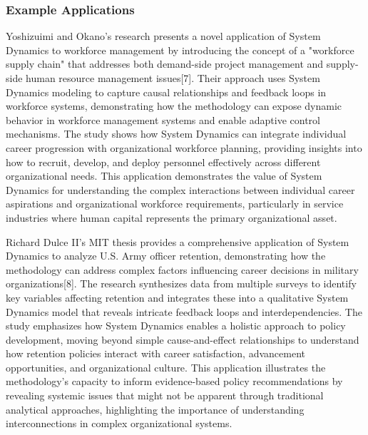 \documentclass[main.tex]{subfiles}
\begin{document}
\subsubsection{Example Applications}


Yoshizuimi and Okano's research presents a novel application of System Dynamics to workforce management by introducing the concept of a "workforce supply chain" that addresses both demand-side project management and supply-side human resource management issues[7]. Their approach uses System Dynamics modeling to capture causal relationships and feedback loops in workforce systems, demonstrating how the methodology can expose dynamic behavior in workforce management systems and enable adaptive control mechanisms. The study shows how System Dynamics can integrate individual career progression with organizational workforce planning, providing insights into how to recruit, develop, and deploy personnel effectively across different organizational needs. This application demonstrates the value of System Dynamics for understanding the complex interactions between individual career aspirations and organizational workforce requirements, particularly in service industries where human capital represents the primary organizational asset.


Richard Dulce II's MIT thesis provides a comprehensive application of System Dynamics to analyze U.S. Army officer retention, demonstrating how the methodology can address complex factors influencing career decisions in military organizations[8]. The research synthesizes data from multiple surveys to identify key variables affecting retention and integrates these into a qualitative System Dynamics model that reveals intricate feedback loops and interdependencies. The study emphasizes how System Dynamics enables a holistic approach to policy development, moving beyond simple cause-and-effect relationships to understand how retention policies interact with career satisfaction, advancement opportunities, and organizational culture. This application illustrates the methodology's capacity to inform evidence-based policy recommendations by revealing systemic issues that might not be apparent through traditional analytical approaches, highlighting the importance of understanding interconnections in complex organizational systems.

\end{document}
